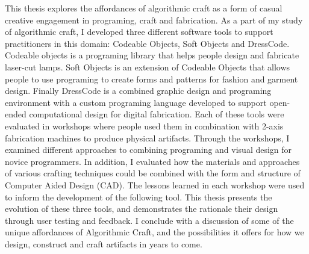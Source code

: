 This thesis explores the affordances of algorithmic craft as a form of casual creative engagement in programing, craft and fabrication. As a part of my study of algorithmic craft, I developed three different software tools to support practitioners in this domain: Codeable Objects, Soft Objects and DressCode. Codeable objects is a programing library that helps people design and fabricate laser-cut lamps. Soft Objects is an extension of Codeable Objects that allows people to use programing to create forms and patterns for fashion and garment design. Finally DressCode is a combined graphic design and programing environment with a custom programing language developed to support open-ended computational design for digital fabrication. Each of these tools were evaluated in workshops where people used them in combination with 2-axis fabrication machines to produce physical artifacts. Through the workshops, I examined different approaches to combining programing and visual design for novice programmers. In addition, I evaluated how the materials and approaches of various crafting techniques could be combined with the form and structure of Computer Aided Design (CAD). The lessons learned in each workshop were used to inform the development of the following tool. This thesis presents the evolution of these three tools, and demonstrates the rationale their design through user testing and feedback. I conclude with a discussion of some of the unique affordances of Algorithmic Craft, and the possibilities it offers for how we design, construct and craft artifacts in years to come.

